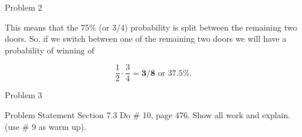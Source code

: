 \begin{problem}{Problem 2}
\begin{Highlight}[Solution]
        This means that the 75\% (or 3/4) probability is split between the remaining two doors. So, if we switch between one of the remaining two doors we will have a probability of winning of

        \begin{equation}
            \frac{1}{2} \cdot \frac{3}{4} = \mathbf{3/8} \text{ or } \mathbf{37.5 \%}.
        \end{equation}
    \end{Highlight}
\end{problem}

\begin{problem}{Problem 3}
    \begin{statement}{Problem Statement}
        Section 7.3 Do \# 10, page 476. Show all work and explain. (use \# 9 as warm up).
    \end{statement}
\end{problem}


